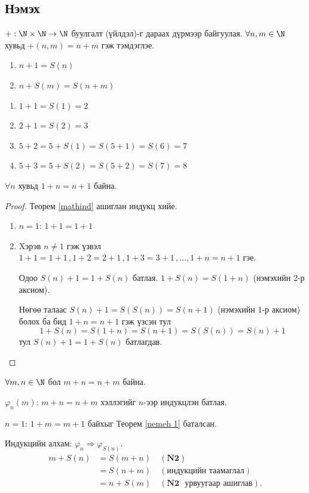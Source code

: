 \subsection{Нэмэх}
\begin{definition} $+: \N\times \N\to\N$ буулгалт (үйлдэл)-г дараах дүрмээр байгуулая. $\forall n , m\in\N$ хувьд $+(n,m)=n+m$ гэж тэмдэглэе.
\begin{enumerate}[label=\textbf{N\arabic*})]
    \item $ n+1= S(n)$
    \item $n+S(m)=S(n+m)$
\end{enumerate} 
\end{definition}
\begin{example}
    \begin{enumerate}
        \item $1+1=S(1)=2$
        \item $2+1=S(2)=3$
        \item $5+2=5+S(1)=S(5+1)=S(6)=7$
        \item $5+3=5+S(2)=S(5+2)=S(7)=8$
    \end{enumerate}
\end{example}
\begin{theorem}\label{nemeh 1}
$\forall n$ хувьд $1+n=n+1$ байна.
\end{theorem}
\begin{proof}
Теорем \ref{mathind} ашиглан индукц хийе. 
\begin{enumerate}
    \item $n=1$: $1+1=1+1$ 
    \item Xэрэв $n\neq 1 $ гэж үзвэл $1+1=1+1 \, , 1+2=2+1 \, , 1+3=3+1 \, , \ldots ,  1+n=n+1 $ гэе. 
    
    Одоо $S(n)+1=1+S(n)$ батлая. $1+S(n)=S(1+n)$ (нэмэхийн 2-р аксиом). 
    
    Нөгөө талаас $S(n)+1=S(S(n))=S(n+1)$ (нэмэхийн 1-р аксиом) болох ба бид $ 1+n=n+1 $ гэж үзсэн тул  $$1+S(n)=S(1+n)=S(n+1)=S(S(n))=S(n)+1$$ тул 
    $S(n)+1=1+S(n)$ батлагдав.
    \qedhere
\end{enumerate}  
\end{proof}

\begin{theorem}
$\forall m,n\in\N$ бол $ m+n=n+m$ байна.
\end{theorem}
\begin{prof}
$\varphi_n(m):\, m+n=n+m$ хэллэгийг $n$-ээр индукцлэн батлая. 

$n=1$: $1+m=m+1$ байхыг Теорем \ref{nemeh 1} баталсан. 

Индукцийн алхам: $\varphi_n\Rightarrow\varphi_{S(n)}$.
\begin{align*}
 m+S(n)&=S(m+n)\quad(\textbf{N2})\\
           &=S(n+m)\quad(\text{индукцийн таамаглал})\\
           &=n+S(m)\quad(\textbf{N2 }\text{ урвуугаар ашиглав}).
\end{align*}
\end{prof}


